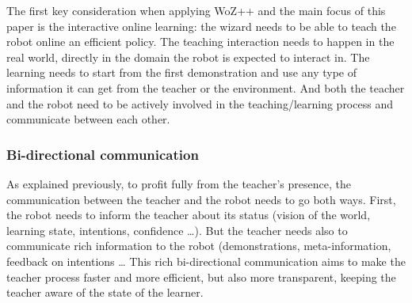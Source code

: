 \documentclass[manuscript, review, anonymous]{acmart}
\newcommand{\ES}[1]{\added[id=ES]{#1}}
\newcommand{\woz}{WoZ++\xspace}
\begin{document}
The first key consideration when applying \woz and the main focus of this paper
is the interactive online learning: the wizard needs to be able to teach the
robot online an efficient policy. The teaching interaction needs to happen in the real world,
directly in the domain the robot is expected to interact in. The learning 
needs to start from the first demonstration and use any type of information it can 
get from the teacher or the environment. And both the teacher and the robot need
to be actively involved in the teaching/learning process and communicate between each other.



\subsubsection{Bi-directional communication}

As explained previously, to profit fully from the teacher's presence, the 
communication between the teacher and the robot needs to go both ways.
First, the robot needs to inform the teacher about its status (vision of the world,
learning state, intentions, confidence \ldots). But the teacher needs also to communicate 
rich information to the robot (demonstrations, meta-information, feedback on intentions  \ldots
This rich bi-directional communication aims to make the teacher process faster and more
efficient, but also more transparent, keeping the teacher aware of the state of the learner.
\end{document}
